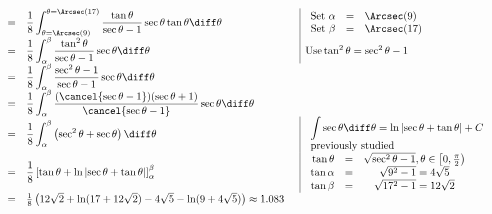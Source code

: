 {\[\begin{array}{rcll|l}
&=&\displaystyle \frac{1}{8}\int_{\theta=\Arcsec(9) }^{\theta=\Arcsec(17)}\frac{\tan \theta}{\sec \theta - 1} \sec \theta \tan \theta \diff \theta  && 
\begin{array}{rcl}
\text{Set }\alpha&=&\Arcsec(9)\\ 
\text{Set }\beta&=&\Arcsec(17)\\ 
\end{array}
\\
&=&\displaystyle \frac{1}{8}\int_{\alpha }^{\beta}\frac{\tan^2 \theta}{\sec \theta - 1} \sec \theta \diff \theta && \text{Use} \tan^2\theta=\sec^2\theta-1\\
&=&\displaystyle \frac{1}{8}\int_{\alpha }^{\beta}\frac{\sec^2 \theta-1}{\sec \theta - 1} \sec \theta \diff \theta \\
&=&\displaystyle \frac{1}{8}\int_{\alpha }^{\beta}\frac{(\cancel{ \sec\theta-1})(\sec \theta+1)}{\cancel{\sec \theta - 1}} \sec \theta \diff \theta \\
&=&\displaystyle \frac{1}{8}\int_{\alpha }^{\beta}\left(\sec^2\theta+ \sec \theta \right)\diff \theta && \begin{array}{l}\displaystyle\int\sec \theta\diff \theta= \ln\left|\sec\theta+\tan\theta\right|+C\\ \text{previously studied}\end{array}\\
&=&\displaystyle \frac{1}{8}\left[\tan \theta +\ln \left|\sec\theta+\tan\theta\right| \right]_{\alpha}^{\beta} && \begin{array}{rlc}\tan \theta &=& \sqrt{\sec^2\theta-1}, \theta\in\left[0,\frac{\pi}{2}\right) \\ \tan \alpha&=&\sqrt{9^2-1}=4\sqrt{5}\\ 
\tan \beta&=& \sqrt{17^2-1}=12\sqrt{2} \end{array}  \\
&=& \frac{1}{8}\left( 12\sqrt{2} +\ln (17+12\sqrt{2})-4\sqrt{5}-\ln (9+4\sqrt{5})\right) \approx 1.083
\end{array}
\]

}

